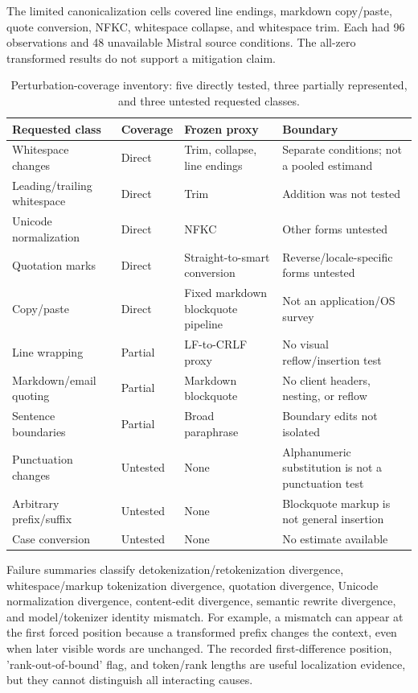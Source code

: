 \documentclass[fleqn,10pt]{wlscirep}
\begin{document}
The limited canonicalization cells covered line endings, markdown copy/paste, quote conversion, NFKC, whitespace collapse, and whitespace trim. Each had 96 observations and 48 unavailable Mistral source conditions. The all-zero transformed results do not support a mitigation claim.

\begin{table}[H]
\centering
\small
\begin{tabularx}{\textwidth}{L{0.21\textwidth}L{0.18\textwidth}Y Y}
\toprule
Requested class & Coverage & Frozen proxy & Boundary \\
\midrule
Whitespace changes & Direct & Trim, collapse, line endings & Separate conditions; not a pooled estimand \\
Leading/trailing whitespace & Direct & Trim & Addition was not tested \\
Unicode normalization & Direct & NFKC & Other forms untested \\
Quotation marks & Direct & Straight-to-smart conversion & Reverse/locale-specific forms untested \\
Copy/paste & Direct & Fixed markdown blockquote pipeline & Not an application/OS survey \\
Line wrapping & Partial & LF-to-CRLF proxy & No visual reflow/insertion test \\
Markdown/email quoting & Partial & Markdown blockquote & No client headers, nesting, or reflow \\
Sentence boundaries & Partial & Broad paraphrase & Boundary edits not isolated \\
Punctuation changes & Untested & None & Alphanumeric substitution is not a punctuation test \\
Arbitrary prefix/suffix & Untested & None & Blockquote markup is not general insertion \\
Case conversion & Untested & None & No estimate available \\
\bottomrule
\end{tabularx}
\caption{\label{tab:coverage}Perturbation-coverage inventory: five directly tested, three partially represented, and three untested requested classes.}
\end{table}

Failure summaries classify detokenization/retokenization divergence, whitespace/markup tokenization divergence, quotation divergence, Unicode normalization divergence, content-edit divergence, semantic rewrite divergence, and model/tokenizer identity mismatch. For example, a mismatch can appear at the first forced position because a transformed prefix changes the context, even when later visible words are unchanged. The recorded first-difference position, 'rank-out-of-bound' flag, and token/rank lengths are useful localization evidence, but they cannot distinguish all interacting causes.
\end{document}
